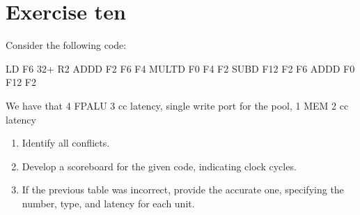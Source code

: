 \section{Exercise ten}

Consider the following code:
\begin{verbnobox}[\verbarg]
LD F6 32+ R2
ADDD F2 F6 F4
MULTD F0 F4 F2
SUBD F12 F2 F6
ADDD F0 F12 F2
\end{verbnobox}
We have that 4 FPALU 3 cc latency, single write port for the pool, 1 MEM 2 cc latency
\begin{enumerate}
    \item Identify all conflicts.
    \item Develop a scoreboard for the given code, indicating clock cycles.
    \item If the previous table was incorrect, provide the accurate one, specifying the number, type, and latency for each unit.
\end{enumerate}

